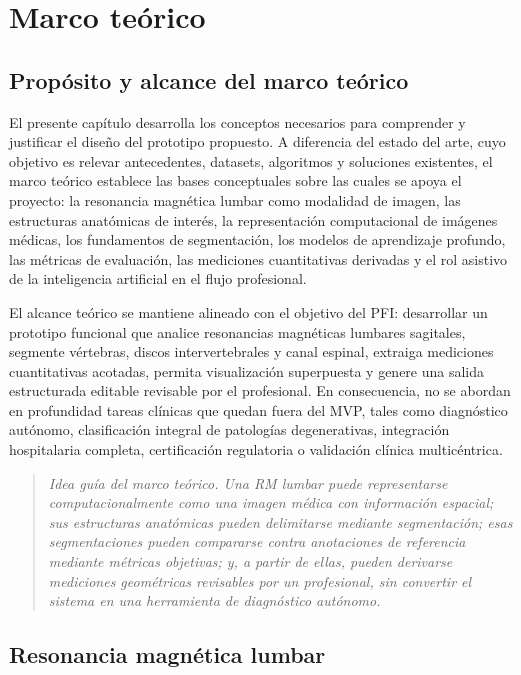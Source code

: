 \chapter{Marco teórico}

\section{Propósito y alcance del marco teórico}

El presente capítulo desarrolla los conceptos necesarios para comprender y justificar el diseño del prototipo propuesto. A diferencia del estado del arte, cuyo objetivo es relevar antecedentes, datasets, algoritmos y soluciones existentes, el marco teórico establece las bases conceptuales sobre las cuales se apoya el proyecto: la resonancia magnética lumbar como modalidad de imagen, las estructuras anatómicas de interés, la representación computacional de imágenes médicas, los fundamentos de segmentación, los modelos de aprendizaje profundo, las métricas de evaluación, las mediciones cuantitativas derivadas y el rol asistivo de la inteligencia artificial en el flujo profesional.

El alcance teórico se mantiene alineado con el objetivo del PFI: desarrollar un prototipo funcional que analice resonancias magnéticas lumbares sagitales, segmente vértebras, discos intervertebrales y canal espinal, extraiga mediciones cuantitativas acotadas, permita visualización superpuesta y genere una salida estructurada editable revisable por el profesional. En consecuencia, no se abordan en profundidad tareas clínicas que quedan fuera del MVP, tales como diagnóstico autónomo, clasificación integral de patologías degenerativas, integración hospitalaria completa, certificación regulatoria o validación clínica multicéntrica.

\begin{quote}
\itshape
Idea guía del marco teórico. Una RM lumbar puede representarse computacionalmente como una imagen médica con información espacial; sus estructuras anatómicas pueden delimitarse mediante segmentación; esas segmentaciones pueden compararse contra anotaciones de referencia mediante métricas objetivas; y, a partir de ellas, pueden derivarse mediciones geométricas revisables por un profesional, sin convertir el sistema en una herramienta de diagnóstico autónomo.
\end{quote}

\section{Resonancia magnética lumbar}

